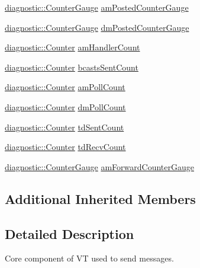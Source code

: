 \begin{DoxyCompactItemize}
\hyperlink{namespacevt_1_1diagnostic_a95e27dc4e2a74cef48e2cf82a3c5cb36}{diagnostic\+::\+Counter\+Gauge} \hyperlink{structvt_1_1messaging_1_1_active_messenger_aec484a9a792d9833d00621cadf3cace8}{am\+Posted\+Counter\+Gauge}
\item 
\hyperlink{namespacevt_1_1diagnostic_a95e27dc4e2a74cef48e2cf82a3c5cb36}{diagnostic\+::\+Counter\+Gauge} \hyperlink{structvt_1_1messaging_1_1_active_messenger_a5fcc4dc86c3b084e781bdb656230c90f}{dm\+Posted\+Counter\+Gauge}
\item 
\hyperlink{namespacevt_1_1diagnostic_a55fcc9d6ffa285d1b085c01df2507d2f}{diagnostic\+::\+Counter} \hyperlink{structvt_1_1messaging_1_1_active_messenger_a6f7a203c3fc2cabd2f6900ecfcd72f89}{am\+Handler\+Count}
\item 
\hyperlink{namespacevt_1_1diagnostic_a55fcc9d6ffa285d1b085c01df2507d2f}{diagnostic\+::\+Counter} \hyperlink{structvt_1_1messaging_1_1_active_messenger_ae7063289867d66c16627d2a5e1d01cd7}{bcasts\+Sent\+Count}
\item 
\hyperlink{namespacevt_1_1diagnostic_a55fcc9d6ffa285d1b085c01df2507d2f}{diagnostic\+::\+Counter} \hyperlink{structvt_1_1messaging_1_1_active_messenger_a0bc9c9fa378e092e29a246e644529a12}{am\+Poll\+Count}
\item 
\hyperlink{namespacevt_1_1diagnostic_a55fcc9d6ffa285d1b085c01df2507d2f}{diagnostic\+::\+Counter} \hyperlink{structvt_1_1messaging_1_1_active_messenger_abb8fb58c74b059143a49fc18140c62f6}{dm\+Poll\+Count}
\item 
\hyperlink{namespacevt_1_1diagnostic_a55fcc9d6ffa285d1b085c01df2507d2f}{diagnostic\+::\+Counter} \hyperlink{structvt_1_1messaging_1_1_active_messenger_a8b33706c08e1f3475b504040cac79fc7}{td\+Sent\+Count}
\item 
\hyperlink{namespacevt_1_1diagnostic_a55fcc9d6ffa285d1b085c01df2507d2f}{diagnostic\+::\+Counter} \hyperlink{structvt_1_1messaging_1_1_active_messenger_a313a1560507175413727fed0464f0b9d}{td\+Recv\+Count}
\item 
\hyperlink{namespacevt_1_1diagnostic_a95e27dc4e2a74cef48e2cf82a3c5cb36}{diagnostic\+::\+Counter\+Gauge} \hyperlink{structvt_1_1messaging_1_1_active_messenger_a3f7864f87ef5d5aa841fa04bb4ab3fb8}{am\+Forward\+Counter\+Gauge}
\end{DoxyCompactItemize}
\subsection*{Additional Inherited Members}


\subsection{Detailed Description}
Core component of VT used to send messages. 

